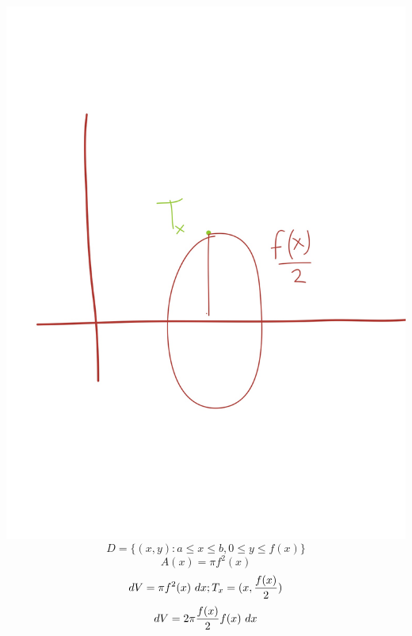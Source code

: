 \documentclass{article}
\begin{document}
\includegraphics[scale=0.10]{img/img2.jpg}
$$ D=\{ (x,y) : a\le x\le b, 0\le y\le f(x) \} $$
$$ A(x) = \pi f^2(x) $$
$$ dV = \pi f^2(x)\ dx; T_x=(x, \frac{f(x)}{2}) $$
$$ dV = 2\pi \frac{f(x)}{2} f(x)\ dx $$
\end{document}
